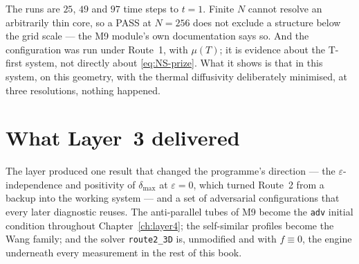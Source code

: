 \begin{obsv}
\label{obs:m9-limits}
The runs are \(25\), \(49\) and \(97\) time steps to \(t=1\). Finite \(N\)
cannot resolve an arbitrarily thin core, so a \textsf{PASS} at \(N=256\) does
not exclude a structure below the grid scale --- the M9 module's own
documentation says so. And the configuration was run under Route~1, with
\(\mu(T)\); it is evidence about the T-first system, not directly about
\eqref{eq:NS-prize}. What it shows is that in this system, on this geometry,
with the thermal diffusivity deliberately minimised, at three resolutions,
nothing happened.
\end{obsv}

\section{What Layer~3 delivered}
\label{sec:layer3-summary}

The layer produced one result that changed the programme's direction --- the
\(\varepsilon\)-independence and positivity of \(\delta_{\max}\) at
\(\varepsilon=0\), which turned Route~2 from a backup into the working system
--- and a set of adversarial configurations that every later diagnostic
reuses. The anti-parallel tubes of M9 become the \texttt{adv} initial
condition throughout Chapter~\ref{ch:layer4}; the self-similar profiles become
the Wang family; and the solver \texttt{route2\_3D} is, unmodified and with
\(f\equiv0\), the engine underneath every measurement in the rest of this
book.
